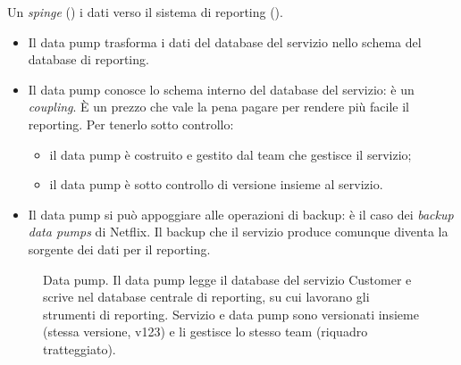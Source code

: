 Un  \emph{spinge} () i dati verso il sistema di reporting ().
\begin{itemize}
  \item Il data pump trasforma i dati del database del servizio nello schema del database di reporting.
  \item Il data pump conosce lo schema interno del database del servizio: è un \emph{coupling}. È un prezzo che vale
    la pena pagare per rendere più facile il reporting. Per tenerlo sotto controllo:
    \begin{itemize}
      \item il data pump è costruito e gestito dal team che gestisce il servizio;
      \item il data pump è sotto controllo di versione insieme al servizio.
    \end{itemize}
  \item Il data pump si può appoggiare alle operazioni di backup: è il caso dei \emph{backup data pumps} di Netflix.
    Il backup che il servizio produce comunque diventa la sorgente dei dati per il reporting.
\end{itemize}

\begin{figure}[ht]
\centering
{}
\caption{Data pump. Il data pump legge il database del servizio Customer e scrive nel database centrale di reporting, su cui
lavorano gli strumenti di reporting. Servizio e data pump sono versionati insieme (stessa versione, v123) e li
gestisce lo stesso team (riquadro tratteggiato).}
\label{fig:split-pump}
\end{figure}

